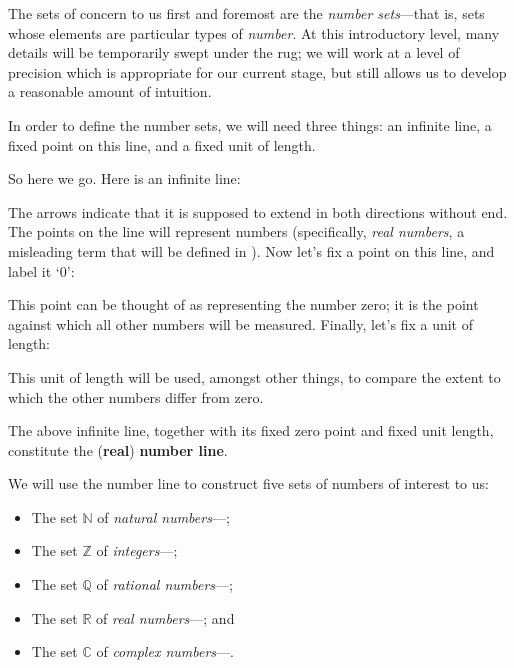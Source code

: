 The sets of concern to us first and foremost are the \textit{number sets}---that is, sets whose elements are particular types of \textit{number}. At this introductory level, many details will be temporarily swept under the rug; we will work at a level of precision which is appropriate for our current stage, but still allows us to develop a reasonable amount of intuition.

In order to define the number sets, we will need three things: an infinite line, a fixed point on this line, and a fixed unit of length.

So here we go. Here is an infinite line:
\begin{center}
\end{center}
The arrows indicate that it is supposed to extend in both directions without end. The points on the line will represent numbers (specifically, \textit{real numbers}, a misleading term that will be defined in ). Now let's fix a point on this line, and label it `$0$':
\begin{center}
\end{center}
This point can be thought of as representing the number zero; it is the point against which all other numbers will be measured. Finally, let's fix a unit of length:
\begin{center}
\end{center}
This unit of length will be used, amongst other things, to compare the extent to which the other numbers differ from zero.

\begin{definition}
\label{defNumberLine}
The above infinite line, together with its fixed zero point and fixed unit length, constitute the (\textbf{real}) \textbf{number line}.
\end{definition}

We will use the number line to construct five sets of numbers of interest to us:
\begin{itemize}
\item The set $\mathbb{N}$ of \textit{natural numbers}---;
\item The set $\mathbb{Z}$ of \textit{integers}---;
\item The set $\mathbb{Q}$ of \textit{rational numbers}---;
\item The set $\mathbb{R}$ of \textit{real numbers}---; and
\item The set $\mathbb{C}$ of \textit{complex numbers}---.
\end{itemize}

